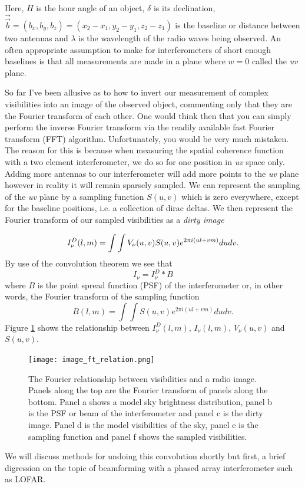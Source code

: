 Here, $H$ is the hour angle of an object, $\delta$ is its declination, $\overrightarrow{\Vec{b}} = (b_x, b_y, b_z)=(x_2-x_1,y_2-y_1,z_2-z_1)$ is the baseline or distance between two antennas and $\lambda$ is the wavelength of the radio waves being observed. An often appropriate assumption to make for interferometers of short enough baselines is that all measurements are made in a plane where $w = 0$ called the \textit{uv} plane.

So far I've been allusive as to how to invert our measurement of complex visibilities into an image of the observed object, commenting only that they are the Fourier transform of each other. One would think then that you can simply perform the inverse Fourier transform via the readily available fast Fourier transform (FFT) algorithm. Unfortunately, you would be very much mistaken. The reason for this is because when measuring the spatial coherence function with a two element interferometer, we do so for one position in \textit{uv} space only. Adding more antennas to our interferometer will add more points to the \textit{uv} plane however in reality it will remain sparsely sampled. We can represent the sampling of the \textit{uv} plane by a sampling function $S(u,v)$ which is zero everywhere, except for the baseline positions, i.e. a collection of dirac deltas. We then represent the Fourier transform of our sampled visibilities as a \textit{dirty image}

\begin{equation}
\label{eq:int_dirtyimage}
I_\nu^D(l, m) = \int \int V_\nu (u,v) S(u,v)e^{2 \pi i (ul + vm)} du dv.\\
\end{equation} 
By use of the convolution theorem we see that 
\begin{equation}
\label{eq:int_convolution}
I_\nu = I_\nu^D \ast B
\end{equation}
where $B$ is the point spread function (PSF) of the interferometer or, in other words, the Fourier transform of the sampling function
\begin{equation}
\label{eq:int_psf}
B(l,m) = \int \int S(u,v) e^{2 \pi i(ul+vm)} du dv.
\end{equation}
Figure \ref{fig:Gary} shows the relationship between $I_\nu^D(l, m)$, $I_\nu(l, m)$,  $V_\nu (u,v)$ and $S(u,v)$.
\begin{figure}[ht]
\texttt{[image: image\_ft\_relation.png]}
\caption[The Fourier relationship between visibilities and a radio image.]{The Fourier relationship between visibilities and a radio image. Panels along the top are the Fourier transform of panels along the bottom. Panel a shows a model sky brightness distribution, panel b is the PSF or beam of the interferometer and panel c is the dirty image. Panel d is the model visibilities of the sky, panel e is the sampling function and panel f shows the sampled visibilities.}
\label{fig:Gary}
\end{figure}
We will discuss methods for undoing this convolution shortly but first, a brief digression on the topic of beamforming with a phased array interferometer such as LOFAR.

